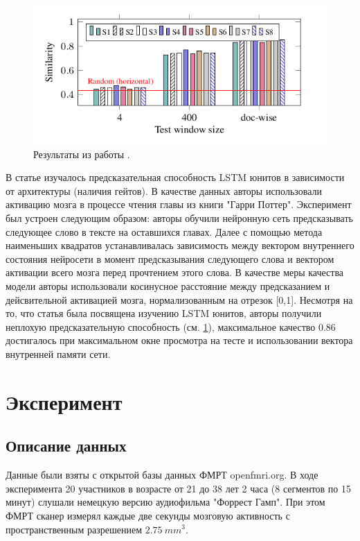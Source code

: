 \documentclass[pdftex,ptm,12pt,a4paper]{report}
\theoremstyle{definition}
\begin{document}
\begin{figure}[h]
\includegraphics[scale=0.7]{images/neural_nets.png}
\centering
\caption{Результаты из работы \cite{qian2016bridging}.}
\label{qian_res}
\end{figure}

В статье \cite{qian2016bridging} изучалось предсказательная способность LSTM юнитов в зависимости от архитектуры (наличия гейтов). В качестве данных авторы использовали активацию мозга в процессе чтения главы из книги "Гарри Поттер". Эксперимент был устроен следующим образом: авторы обучили нейронную сеть предсказывать следующее слово в тексте на оставшихся главах. Далее с помощью метода наименьших квадратов устанавливалась зависимость между вектором внутреннего состояния нейросети в момент предсказывания следующего слова и вектором активации всего мозга перед прочтением этого слова. В качестве меры качества модели авторы использовали косинусное расстояние между предсказанием и дейсвительной активацией мозга, нормализованным на отрезок [0,1]. Несмотря на то, что статья была посвящена изучению LSTM юнитов, авторы получили неплохую предсказательную способность (см. \ref{qian_res}), максимальное качество 0.86 достигалось при максимальном окне просмотра на тесте и использовании вектора внутренней памяти сети.


\chapter{Эксперимент}

\section{Описание данных}

Данные были взяты с открытой базы данных ФМРТ openfmri.org. В ходе эксперимента 20 участников в возрасте от 21 до 38 лет 2 часа (8 сегментов по 15 минут) слушали немецкую версию аудиофильма "Форрест Гамп". При этом ФМРТ сканер измерял каждые две секунды мозговую активность с пространственным разрешением $2.75\ mm^3$.
\end{document}
